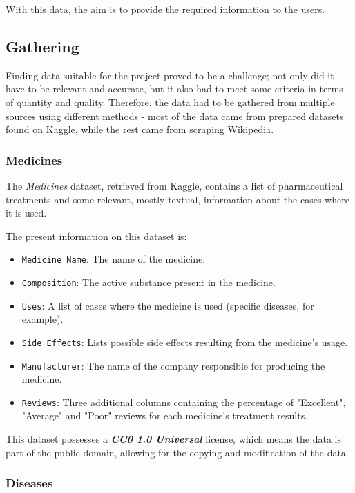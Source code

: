\documentclass[sigconf]{acmart}
\begin{document}
With this data, the aim is to provide the required information to the users.

\subsection{Gathering}

Finding data suitable for the project proved to be a challenge; not only did it have to be relevant and accurate, but it also had to meet some criteria in terms of quantity and quality. Therefore, the data had to be gathered from multiple sources using different methods - most of the data came from prepared datasets found on Kaggle\cite{kaggle}, while the rest came from scraping Wikipedia\cite{wikipedia}.

\subsubsection{Medicines}

The \textit{Medicines} dataset\cite{medicines_dataset}, retrieved from Kaggle, contains a list of pharmaceutical treatments and some relevant, mostly textual, information about the cases where it is used.

The present information on this dataset is:
\begin{itemize}
	\item {\texttt{Medicine Name}}: The name of the medicine.
	\item {\texttt{Composition}}: The active substance present in the medicine.
	\item {\texttt{Uses}}: A list of cases where the medicine is used (specific diseases, for example).
	\item {\texttt{Side Effects}}: Lists possible side effects resulting from the medicine's usage.
	\item {\texttt{Manufacturer}}: The name of the company responsible for producing the medicine.
	\item {\texttt{Reviews}}: Three additional columns containing the percentage of "Excellent", "Average" and "Poor" reviews for each medicine's treatment results.
\end{itemize}

This dataset possesses a {\textit{\textbf{CC0 1.0 Universal}}}\cite{cczero} license, which means the data is part of the public domain, allowing for the copying and modification of the data.

\subsubsection{Diseases}
\end{document}
